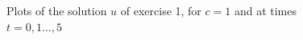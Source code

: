 \begin{figure}[!ht]
{            }
    \caption{Plots of the solution $u$ of exercise 1, for $c=1$ and at times $t=0,1\dots,5$}
    \label{fig:ex1-plots-c1}
    \end{figure}

    \begin{figure}[!ht]
    \centering
    \mbox{ \quad 
            }
    \mbox{ \quad 
}
\end{figure}
